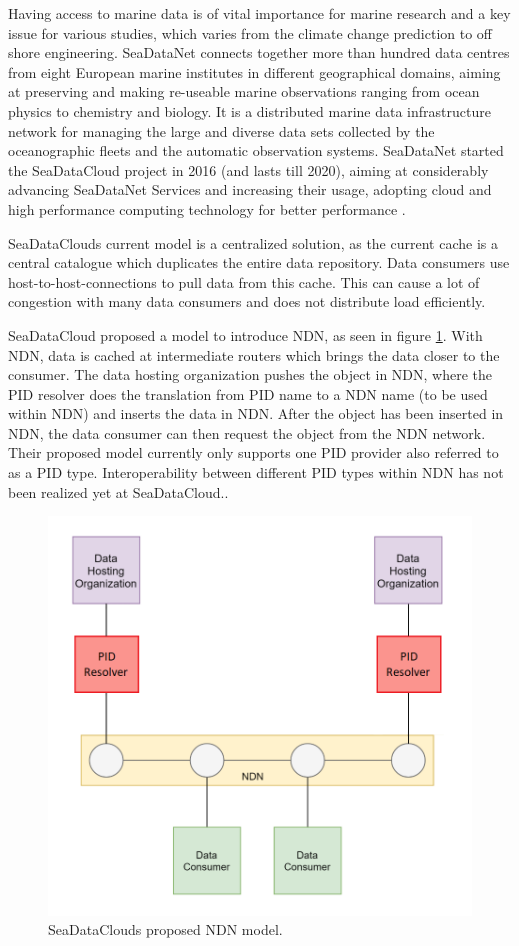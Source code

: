 Having access to marine data is of vital importance for marine research and a key issue for various studies, which varies from the climate change prediction to off shore engineering.
SeaDataNet connects together more than hundred data centres from eight European marine institutes in different geographical domains, aiming at preserving and making re-useable marine observations ranging from ocean physics to chemistry and biology. 
It is a distributed marine data infrastructure network for managing the large and diverse data sets collected by the oceanographic fleets and the automatic observation systems.
SeaDataNet started the SeaDataCloud project in 2016 (and lasts till 2020), aiming at considerably advancing SeaDataNet Services and increasing their usage, adopting cloud and high performance computing technology for better performance \cite{sdc}.

SeaDataClouds current model is a centralized solution, as the current cache is a central catalogue which duplicates the entire data repository. Data consumers use host-to-host-connections to pull data from this cache. This can cause a lot of congestion with many data consumers and does not distribute load efficiently. 

SeaDataCloud proposed a model to introduce NDN, as seen in figure \ref{fig:sdc_ndn}. With NDN, data is cached at intermediate routers which brings the data closer to the consumer. The data hosting organization pushes the object in NDN, where the PID resolver does the translation from PID name to a NDN name (to be used within NDN) and inserts the data in NDN. After the object has been inserted in NDN, the data consumer can then request the object from the NDN network.
Their proposed model currently only supports one PID provider also referred to as a PID type. Interoperability between different PID types within NDN has not been realized yet at SeaDataCloud..

\begin{figure}[H]
\centering
\includegraphics[scale=0.4]{Images/sdcrp2.png}
\caption{SeaDataClouds proposed NDN model.}
\label{fig:sdc_ndn}
\end{figure}


